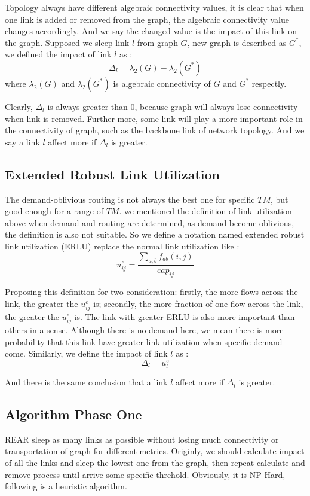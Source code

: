 \documentclass[conference]{IEEEtran}
\begin{document}
Topology always have different algebraic connectivity values, it is clear that when one link is added or 
removed from the graph, the algebraic connectivity value changes accordingly. And we say the changed value
is the impact of this link on the graph. Supposed we sleep link $l$ from graph $G$, new graph is described as $G^*$, 
we defined the impact of link $l$ as :
\begin{equation}
	\Delta_l = \lambda_2(G) - \lambda_2(G^*)
\end{equation}
where $\lambda_2(G)$ and $\lambda_2(G^*)$ is algebraic connectivity of $G$ and $G^*$ respectly.


Clearly, $\Delta_l$ is always greater than 0, because graph will always lose connectivity when link is removed.
Further more, some link will play a more important role in the connectivity of graph, such as the backbone link 
of network topology. And we say a link $l$ affect more if $\Delta_l$ is greater.

\subsection{Extended Robust Link Utilization}
The demand-oblivious routing is not always the best one for 
specific $TM$, but good enough for a range of $TM$. we mentioned the definition of link utilization above when 
demand and routing are determined, as demand become oblivious, the definition is also not suitable. So we define
a notation named extended robust link utilization (ERLU) replace the normal link utilization like :
\begin{equation}
	u^e_{ij} = \frac {\sum_{a,b}f_{ab}(i,j)} {cap_{ij}}
\end{equation}


Proposing this definition for two consideration: firstly, the more flows across the link, the greater the $u^e_{ij}$ is;
secondly, the more fraction of one flow across the link, the greater the $u^e_{ij}$ is. The link with greater
ERLU is also more important than others in a sense. Although there is no demand here, we mean
there is more probability that this link have greater link utilization when specific demand come. Similarly, we define 
the impact of link $l$ as :
\begin{equation}
    \Delta_l = u^e_{l}
\end{equation}

And there is the same conclusion that a link $l$ affect more if $\Delta_l$ is greater.


\subsection{Algorithm Phase One}
REAR sleep as many links as possible without losing much connectivity or transportation of graph for different metrics. 
Originly,  we should calculate impact of all the links and sleep the lowest one from the graph, then repeat calculate and remove
process until arrive some specific threhold. Obviously, it is NP-Hard, following is a heuristic algorithm.
\end{document}
